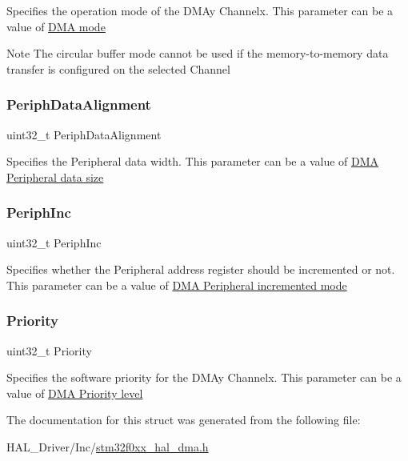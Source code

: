 Specifies the operation mode of the D\+M\+Ay Channelx. This parameter can be a value of \hyperlink{group___d_m_a__mode}{D\+MA mode} \begin{DoxyNote}{Note}
The circular buffer mode cannot be used if the memory-\/to-\/memory data transfer is configured on the selected Channel 
\end{DoxyNote}
\mbox{\label{struct_d_m_a___init_type_def_aca5b89241171c093fd0fc6dacf72683c}} 
\subsubsection{\texorpdfstring{Periph\+Data\+Alignment}{PeriphDataAlignment}}
{\footnotesize\ttfamily uint32\+\_\+t Periph\+Data\+Alignment}

Specifies the Peripheral data width. This parameter can be a value of \hyperlink{group___d_m_a___peripheral__data__size}{D\+MA Peripheral data size} \mbox{\label{struct_d_m_a___init_type_def_a4925ca3ceb52340daddc92817dc304d9}} 
\subsubsection{\texorpdfstring{Periph\+Inc}{PeriphInc}}
{\footnotesize\ttfamily uint32\+\_\+t Periph\+Inc}

Specifies whether the Peripheral address register should be incremented or not. This parameter can be a value of \hyperlink{group___d_m_a___peripheral__incremented__mode}{D\+MA Peripheral incremented mode} \mbox{\label{struct_d_m_a___init_type_def_a72acf77c0b19359eb70764505ae4bd70}} 
\subsubsection{\texorpdfstring{Priority}{Priority}}
{\footnotesize\ttfamily uint32\+\_\+t Priority}

Specifies the software priority for the D\+M\+Ay Channelx. This parameter can be a value of \hyperlink{group___d_m_a___priority__level}{D\+MA Priority level} 

The documentation for this struct was generated from the following file\+:\begin{DoxyCompactItemize}
\item 
H\+A\+L\+\_\+\+Driver/\+Inc/\hyperlink{stm32f0xx__hal__dma_8h}{stm32f0xx\+\_\+hal\+\_\+dma.\+h}\end{DoxyCompactItemize}
